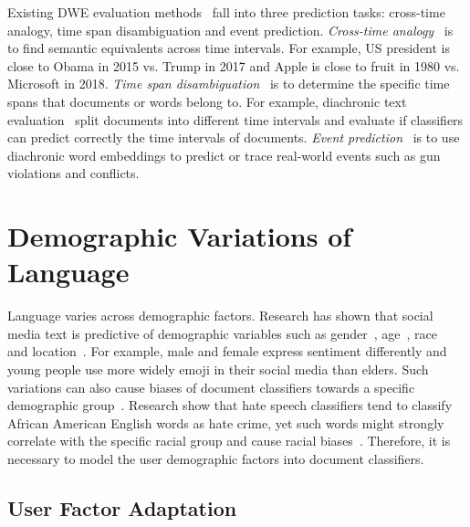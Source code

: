 Existing DWE evaluation methods~\cite{kutuzov2018diachronic} fall into three prediction tasks: cross-time analogy, time span disambiguation and event prediction.
\textit{Cross-time analogy}~\cite{szymanski2017temporal, yao2018dynamic} is to find semantic equivalents across time intervals.
For example, US president is close to Obama in 2015 vs. Trump in 2017 and Apple is close to fruit in 1980 vs. Microsoft in 2018.
\textit{Time span disambiguation}~\cite{mihalcea2012word, popescu2015semeval} is to determine the specific time spans that documents or words belong to. 
For example, diachronic text evaluation~\cite{popescu2015semeval} split documents into different time intervals and evaluate if classifiers can predict correctly the time intervals of documents.
\textit{Event prediction}~\cite{kutuzov2017tracing} is to use diachronic word embeddings to predict or trace real-world events such as gun violations and conflicts.


\section{Demographic Variations of Language}
\label{chap2:sec:demographic}

Language varies across demographic factors. 
Research has shown that social media text is predictive of demographic variables such as 
gender~\cite{Rao:2010:CLU:1871985.1871993,Rao2011,Burger:2011:DGT:2145432.2145568,volkova2015inferring}, age~\cite{rosenthal2011age, hovy2015tagging,johannsen2015cross, zhang2016predicting, diaz2018addressing}, race~\cite{preoctiuc2018user} and location~\cite{EisensteinEtAl10,wing2011simple,wing2014hierarchical}.
For example, male and female express sentiment differently and young people use more widely emoji in their social media than elders.
Such variations can also cause biases of document classifiers towards a specific demographic group~\cite{sun2019mitigating}.
Research show that hate speech classifiers tend to classify African American English words as hate crime, yet such words might strongly correlate with the specific racial group and cause racial biases~\cite{davidson2019racial, sap2019risk}.
Therefore, it is necessary to model the user demographic factors into document classifiers.


\subsection{User Factor Adaptation}

